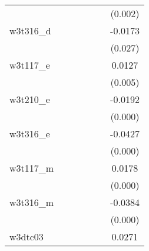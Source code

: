 {\begin{tabular}{l*{6}{c}}
            &                     &                     &                     &                     &                     &     (0.002)         \\
[1em]
w3t316\_d    &                     &                     &                     &                     &                     &     -0.0173\sym{**} \\
            &                     &                     &                     &                     &                     &     (0.027)         \\
[1em]
w3t117\_e    &                     &                     &                     &                     &                     &      0.0127\sym{***}\\
            &                     &                     &                     &                     &                     &     (0.005)         \\
[1em]
w3t210\_e    &                     &                     &                     &                     &                     &     -0.0192\sym{***}\\
            &                     &                     &                     &                     &                     &     (0.000)         \\
[1em]
w3t316\_e    &                     &                     &                     &                     &                     &     -0.0427\sym{***}\\
            &                     &                     &                     &                     &                     &     (0.000)         \\
[1em]
w3t117\_m    &                     &                     &                     &                     &                     &      0.0178\sym{***}\\
            &                     &                     &                     &                     &                     &     (0.000)         \\
[1em]
w3t316\_m    &                     &                     &                     &                     &                     &     -0.0384\sym{***}\\
            &                     &                     &                     &                     &                     &     (0.000)         \\
[1em]
w3dtc03     &                     &                     &                     &                     &                     &      0.0271\sym{***}\\

\end{tabular}}
